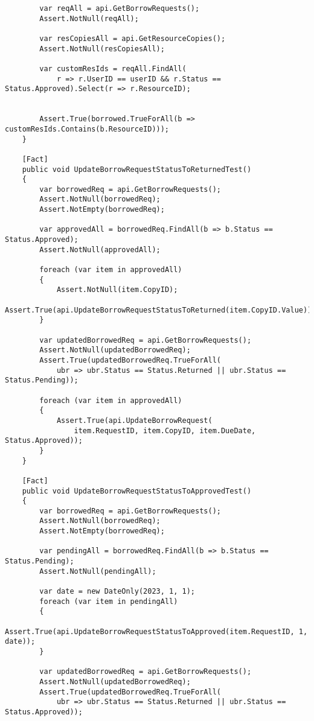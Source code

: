 \begin{verbatim}
        var reqAll = api.GetBorrowRequests();
        Assert.NotNull(reqAll);

        var resCopiesAll = api.GetResourceCopies();
        Assert.NotNull(resCopiesAll);

        var customResIds = reqAll.FindAll(
            r => r.UserID == userID && r.Status == Status.Approved).Select(r => r.ResourceID);


        Assert.True(borrowed.TrueForAll(b => customResIds.Contains(b.ResourceID)));
    }

    [Fact]
    public void UpdateBorrowRequestStatusToReturnedTest()
    {
        var borrowedReq = api.GetBorrowRequests();
        Assert.NotNull(borrowedReq);
        Assert.NotEmpty(borrowedReq);

        var approvedAll = borrowedReq.FindAll(b => b.Status == Status.Approved);
        Assert.NotNull(approvedAll);

        foreach (var item in approvedAll)
        {
            Assert.NotNull(item.CopyID);
            Assert.True(api.UpdateBorrowRequestStatusToReturned(item.CopyID.Value));
        }

        var updatedBorrowedReq = api.GetBorrowRequests();
        Assert.NotNull(updatedBorrowedReq);
        Assert.True(updatedBorrowedReq.TrueForAll(
            ubr => ubr.Status == Status.Returned || ubr.Status == Status.Pending));

        foreach (var item in approvedAll)
        {
            Assert.True(api.UpdateBorrowRequest(
                item.RequestID, item.CopyID, item.DueDate, Status.Approved));
        }
    }

    [Fact]
    public void UpdateBorrowRequestStatusToApprovedTest()
    {
        var borrowedReq = api.GetBorrowRequests();
        Assert.NotNull(borrowedReq);
        Assert.NotEmpty(borrowedReq);

        var pendingAll = borrowedReq.FindAll(b => b.Status == Status.Pending);
        Assert.NotNull(pendingAll);

        var date = new DateOnly(2023, 1, 1);
        foreach (var item in pendingAll)
        {
            Assert.True(api.UpdateBorrowRequestStatusToApproved(item.RequestID, 1, date));
        }

        var updatedBorrowedReq = api.GetBorrowRequests();
        Assert.NotNull(updatedBorrowedReq);
        Assert.True(updatedBorrowedReq.TrueForAll(
            ubr => ubr.Status == Status.Returned || ubr.Status == Status.Approved));


\end{verbatim}
